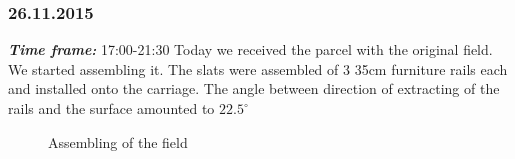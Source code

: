 \subsubsection{26.11.2015}
\textit{\textbf{Time frame:}} 17:00-21:30 \newline
Today we received the parcel with the original field. We started assembling it.
The slats were assembled of 3 35cm furniture rails each and installed onto the carriage. The angle between direction of extracting of the rails and the surface amounted to $22.5^\circ$

\begin{figure}[H]
	\begin{minipage}[h]{0.31\linewidth}
		\caption{Assembling of the field}
	\end{minipage}
	\hfill
	\begin{minipage}[h]{0.31\linewidth}

\end{minipage}
\end{figure}
